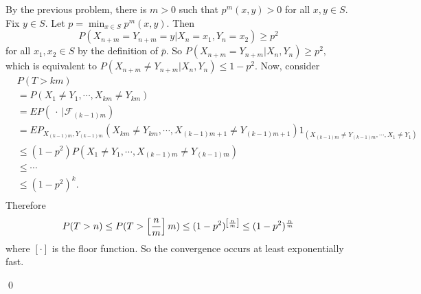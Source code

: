 \begin{problem}[5.6.3] \hfill

	By the previous problem, there is $m>0$ such that $p^m(x, y)>0$ for all $x,y \in S$.
	Fix $y \in S$.
	Let $p = \min_{x\in S} p^m(x, y).$
	Then
	\[
		P\left( X_{n+m} = Y_{n+m} = y \lvert X_n = x_1, Y_n = x_2 \right) \geq p^2
	\]
	for all $x_1, x_2 \in S$ by the definition of $\bar{p}$.
	So $P\left( X_{n+m} = Y_{n+m} \lvert X_n, Y_n \right) \ge p^2,$
	which is equivalent to $P\left( X_{n+m} \ne Y_{n+m} \lvert X_n, Y_n \right) \le 1-p^2.$
	Now, consider 
	\[
		\begin{split}
			& P(T > km) \\
			&= P\left ( X_1 \ne Y_1, \cdots, X_{km} \ne Y_{km} \right ) \\
			&= EP(\ \cdot \ \lvert \mathcal{F}_{(k-1)m}) \\
			&= EP_{X_{(k-1)m}, Y_{(k-1)m}}\left( X_{km} \ne Y_{km}, \cdots, X_{(k-1)m+1} \ne Y_{(k-1)m+1} \right )1_{\left( X_{(k-1)m} \ne Y_{(k-1)m}, \cdots, X_1 \ne Y_1 \right)} \\
			&\le (1-p^2)P(X_1 \ne Y_1, \cdots, X_{(k-1)m} \ne Y_{(k-1)m})\\
			&\le \cdots \\
			&\le (1-p^2)^k. \\
		\end{split}
	\]
	Therefore
	\[
		P(T>n) \le P(T>\left[ n\over m \right]m) \le (1-p^2)^{\left[ n\over m \right]} \le (1-p^2)^{n\over m}
	\]
	where $[ \cdot ]$ is the floor function.
	So the convergence occurs at least exponentially fast.

	\qed
\end{problem}

